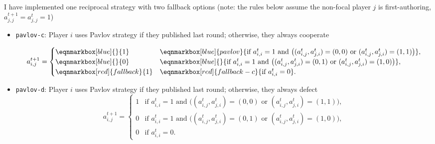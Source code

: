 \documentclass[12pt]{article}
\begin{document}
I have implemented one reciprocal strategy with two fallback options
(note: the rules below assume the non-focal player $j$ is first-authoring,
$a_{j, j}^{t+1} = a_{j, j}^t = 1$)
\begin{itemize}
    \item {\tt pavlov-c}:
    Player $i$ uses Pavlov strategy if they published last round;
    otherwise, they always cooperate

    \vspace{1em}
    \begin{equation*}
        a_{i,j}^{t+1} =
        \begin{cases}
            \eqnmarkbox[blue]{}{1} & 
            \eqnmarkbox[blue]{pavlov}{
                \text{if } a_{i, i}^t = 1 \text{ and } \big( (a_{i,j}^t, a_{j,i}^t) = (0, 0) 
                \text{ or } (a_{i,j}^t, a_{j,i}^t) = (1, 1) \big)}, \\
            \eqnmarkbox[blue]{}{0} & 
            \eqnmarkbox[blue]{}{
                \text{if } a_{i, i}^t = 1 \text{ and } \big( (a_{i,j}^t, a_{j,i}^t) = (0, 1) 
                \text{ or } (a_{i,j}^t, a_{j,i}^t) = (1, 0) \big)}, \\
            \eqnmarkbox[red]{fallback}{1} & \eqnmarkbox[red]{fallback-c}{\text{if } a_{i, i}^t = 0}.
        \end{cases}
    \end{equation*}
    
    \item {\tt pavlov-d}:
    Player $i$ uses Pavlov strategy if they published last round;
    otherwise, they always defect
    \begin{equation*}
        a_{i,j}^{t+1} =
        \begin{cases}
            1 & \text{if } a_{i, i}^t = 1 \text{ and } \big( (a_{i,j}^t, a_{j,i}^t) = (0, 0) 
                \text{ or } (a_{i,j}^t, a_{j,i}^t) = (1, 1) \big), \\
            0 & \text{if } a_{i, i}^t = 1 \text{ and } \big( (a_{i,j}^t, a_{j,i}^t) = (0, 1) 
                \text{ or } (a_{i,j}^t, a_{j,i}^t) = (1, 0) \big), \\
            0 & \text{if } a_{i, i}^t = 0.
        \end{cases}
    \end{equation*}
\end{itemize}
\end{document}
